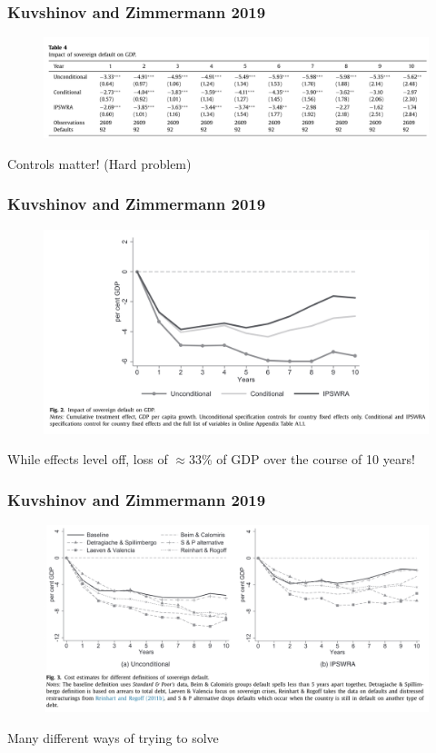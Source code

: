 \documentclass{beamer}
\begin{document}
\begin{frame}
\frametitle{Kuvshinov and  Zimmermann 2019}
\begin{figure}
\centering
\includegraphics[scale=0.6]{Kuvshinov_1.png}
\end{figure}
Controls matter! (Hard problem)
\end{frame}

\begin{frame}
\frametitle{Kuvshinov and  Zimmermann 2019}
\begin{figure}
\centering
\includegraphics[scale=0.5]{Kuvshinov_2.png}
\end{figure}
While effects level off, loss of $\approx$33\% of GDP over the course of 10 years!
\end{frame}

\begin{frame}
\frametitle{Kuvshinov and  Zimmermann 2019}
\begin{figure}
\centering
\includegraphics[scale=0.5]{Kuvshinov_3.png}
\end{figure}
Many different ways of trying to solve
\end{frame}
\end{document}
